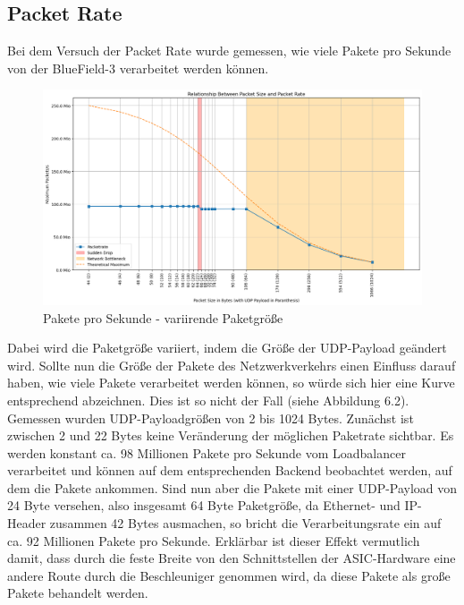 \subsection{Packet Rate}
Bei dem Versuch der Packet Rate wurde gemessen, wie viele Pakete pro Sekunde von der BlueField-3 verarbeitet werden können.
\begin{figure}
    \centering
    \includegraphics[width=1\linewidth]{images/pps_pps.png}
    \caption{Pakete pro Sekunde - variirende Paketgröße}
    \label{fig:enter-label}
\end{figure}
Dabei wird die Paketgröße variiert, indem die Größe der UDP-Payload geändert wird. Sollte nun die Größe der Pakete des Netzwerkverkehrs einen Einfluss darauf haben, wie viele Pakete verarbeitet werden können, so würde sich hier eine Kurve entsprechend abzeichnen. Dies ist so nicht der Fall (siehe Abbildung 6.2). Gemessen wurden UDP-Payloadgrößen von 2 bis 1024 Bytes. Zunächst ist zwischen 2 und 22 Bytes keine Veränderung der möglichen Paketrate sichtbar. Es werden konstant ca. 98 Millionen Pakete pro Sekunde vom Loadbalancer verarbeitet und können auf dem entsprechenden Backend beobachtet werden, auf dem die Pakete ankommen. Sind nun aber die Pakete mit einer UDP-Payload von 24 Byte versehen, also insgesamt 64 Byte Paketgröße, da Ethernet- und IP-Header zusammen 42 Bytes ausmachen, so bricht die Verarbeitungsrate ein auf ca. 92 Millionen Pakete pro Sekunde. Erklärbar ist dieser Effekt vermutlich damit, dass durch die feste Breite von den Schnittstellen der ASIC-Hardware eine andere Route durch die Beschleuniger genommen wird, da diese Pakete als große Pakete behandelt werden.

